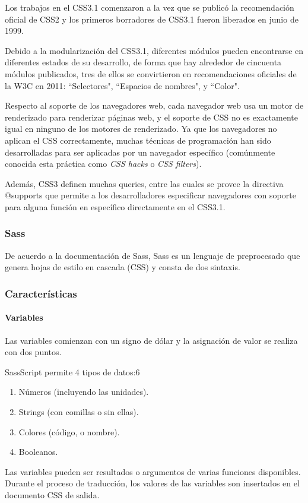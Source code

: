 Los trabajos en el CSS3.1 comenzaron a la vez que se publicó la recomendación oficial de CSS2 y los primeros borradores de CSS3.1 fueron liberados en junio de 1999.


Debido a la modularización del CSS3.1, diferentes módulos pueden encontrarse en diferentes estados de su desarrollo,​ de forma que hay alrededor de cincuenta módulos publicados,​ tres de ellos se convirtieron en recomendaciones oficiales de la W3C en 2011: ``Selectores", ``Espacios de nombres", y ``Color".


Respecto al soporte de los navegadores web, cada navegador web usa un motor de renderizado para renderizar páginas web, y el soporte de CSS no es exactamente igual en ninguno de los motores de renderizado. Ya que los navegadores no aplican el CSS correctamente, muchas técnicas de programación han sido desarrolladas para ser aplicadas por un navegador específico (comúnmente conocida esta práctica como \textit{CSS hacks} o \textit{CSS filters}).


Además, CSS3 definen muchas queries, entre las cuales se provee la directiva @supports que permite a los desarrolladores especificar navegadores con soporte para alguna función en específico directamente en el CSS3.1​. 

\subsubsection*{Sass}

De acuerdo a la documentación de Sass\cite{noauthor_documentation_nodate}, Sass es un lenguaje de preprocesado que genera hojas de estilo en cascada (CSS) y consta de dos sintaxis.

\subsubsection*{Características}

\paragraph*{Variables}
Las variables comienzan con un signo de dólar y la asignación de valor se realiza con dos puntos.

SassScript permite 4 tipos de datos:6​
\begin{enumerate}
    \item Números (incluyendo las unidades).
    \item Strings (con comillas o sin ellas).
    \item Colores (código, o nombre).
    \item Booleanos.
\end{enumerate}
Las variables pueden ser resultados o argumentos de varias funciones disponibles. Durante el proceso de traducción, los valores de las variables son insertados en el documento CSS de salida.

